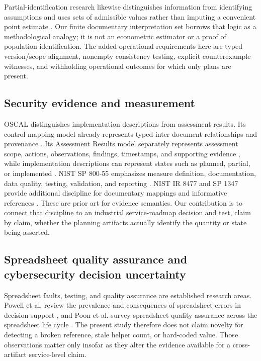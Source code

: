\documentclass[systems,article,submit,moreauthors]{Definitions/mdpi}
\begin{document}
Partial-identification research likewise distinguishes information from identifying assumptions and uses sets of admissible values rather than imputing a convenient point estimate \cite{Manski2005}. Our finite documentary interpretation set borrows that logic as a methodological analogy; it is not an econometric estimator or a proof of population identification. The added operational requirements here are typed version/scope alignment, nonempty consistency testing, explicit counterexample witnesses, and withholding operational outcomes for which only plans are present.

\subsection{Security evidence and measurement}
OSCAL distinguishes implementation descriptions from assessment results. Its control-mapping model already represents typed inter-document relationships and provenance \cite{OSCALMapping2026}. Its Assessment Results model separately represents assessment scope, actions, observations, findings, timestamps, and supporting evidence \cite{OSCALAR2026}, while implementation descriptions can represent states such as planned, partial, or implemented \cite{OSCAL2026}. NIST SP 800-55 emphasizes measure definition, documentation, data quality, testing, validation, and reporting \cite{NIST80055v1,NIST80055v2}. NIST IR 8477 and SP 1347 provide additional discipline for documentary mappings and informative references \cite{NIST8477,NIST1347}. These are prior art for evidence semantics. Our contribution is to connect that discipline to an industrial service-roadmap decision and test, claim by claim, whether the planning artifacts actually identify the quantity or state being asserted.


\subsection{Spreadsheet quality assurance and cybersecurity decision uncertainty}
Spreadsheet faults, testing, and quality assurance are established research areas. Powell et al. review the prevalence and consequences of spreadsheet errors in decision support \cite{Powell2008}, and Poon et al. survey spreadsheet quality assurance across the spreadsheet life cycle \cite{Poon2024}. The present study therefore does not claim novelty for detecting a broken reference, stale helper count, or hard-coded value. Those observations matter only insofar as they alter the evidence available for a cross-artifact service-level claim.
\end{document}
